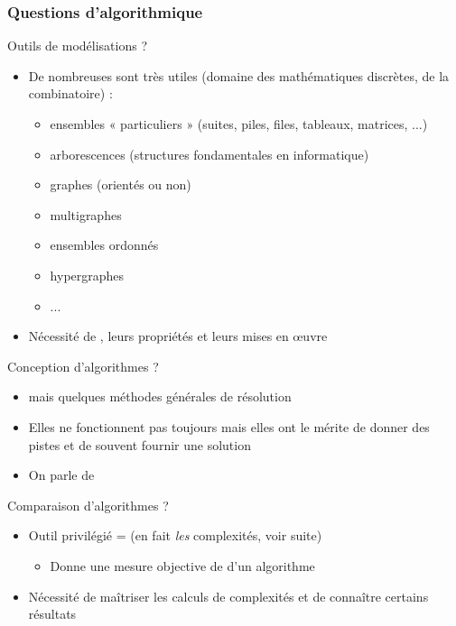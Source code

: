 \documentclass[aspectratio=1610,francais,envcountsect]{beamer}
\begin{document}
\begin{frame}[allowframebreaks]
  \frametitle{Questions d'algorithmique}

  \begin{block}{Outils de modélisations ?}
    \begin{itemize}
    \item De nombreuses  sont très
      utiles (domaine des mathématiques discrètes, de la combinatoire)
      :
      \begin{itemize}
      \item ensembles « particuliers » (suites, piles, files,
        tableaux, matrices, ...)
      \item arborescences (structures fondamentales en informatique)
      \item graphes (orientés ou non)
      \item multigraphes
      \item ensembles ordonnés
      \item hypergraphes
      \item ...
      \end{itemize}
    \item Nécessité de , leurs
      propriétés et leurs mises en œuvre
    \end{itemize}

  \end{block}

  \framebreak

  \begin{block}{Conception d'algorithmes ?}
    \begin{itemize}
    \item {} mais quelques méthodes
      générales de résolution
    \item Elles ne fonctionnent pas toujours mais elles ont le mérite
      de donner des pistes et de souvent fournir une solution
    \item On parle de 
    \end{itemize}
  \end{block}

  \framebreak

  \begin{block}{Comparaison d'algorithmes ?}
    \begin{itemize}
    \item Outil privilégié =  (en fait
      \emph{les} complexités, voir suite)
      \begin{itemize}
      \item Donne une mesure objective de 
        d'un algorithme
      \end{itemize}
    \item Nécessité de maîtriser les calculs de complexités et de
      connaître certains résultats
    \end{itemize}
  \end{block}


\end{frame}
\end{document}
